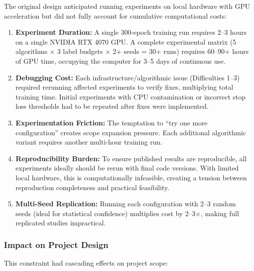 The original design anticipated running experiments on local hardware with GPU acceleration but did not fully account for cumulative computational costs:

\begin{enumerate}
    \item \textbf{Experiment Duration:} A single 300-epoch training run requires 2--3 hours on a single NVIDIA RTX 4070 GPU. A complete experimental matrix (5 algorithms $\times$ 3 label budgets $\times$ 2+ seeds = 30+ runs) requires 60--90+ hours of GPU time, occupying the computer for 3--5 days of continuous use.

    \item \textbf{Debugging Cost:} Each infrastructure/algorithmic issue (Difficulties 1--3) required rerunning affected experiments to verify fixes, multiplying total training time. Initial experiments with CPU contamination or incorrect stop loss thresholds had to be repeated after fixes were implemented.

    \item \textbf{Experimentation Friction:} The temptation to ``try one more configuration'' creates scope expansion pressure. Each additional algorithmic variant requires another multi-hour training run.

    \item \textbf{Reproducibility Burden:} To ensure published results are reproducible, all experiments ideally should be rerun with final code versions. With limited local hardware, this is computationally infeasible, creating a tension between reproduction completeness and practical feasibility.

    \item \textbf{Multi-Seed Replication:} Running each configuration with 2--3 random seeds (ideal for statistical confidence) multiplies cost by 2--3$\times$, making full replicated studies impractical.
\end{enumerate}

\subsubsection{Impact on Project Design}

This constraint had cascading effects on project scope:

